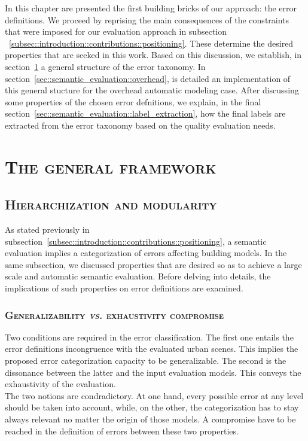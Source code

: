 \minitoc

\vfill

In this chapter are presented the first building bricks of our approach: the error definitions.
We proceed by reprising the main consequences of the constraints that were imposed for our evaluation approach in subsection ~\ref{subsec::introduction::contributions::positioning}.
These determine the desired properties that are seeked in this work.
Based on this discussion, we establish, in section~\ref{sec::semantic_evaluation::general_framework} a general structure of the error taxonomy.
In section~\ref{sec::semantic_evaluation::overhead}, is detailed an implementation of this general stucture for the overhead automatic modeling case.
After discussing some properties of the chosen error defnitions, we explain, in the final section~\ref{sec::semantic_evaluation::label_extraction}, how the final labels are extracted from the error taxonomy based on the quality evaluation needs.

\clearpage

\section{\textsc{The general framework}}
    \label{sec::semantic_evaluation::general_framework}

    \subsection{\textsc{Hierarchization and modularity}}
        \label{subsec::semantic_evaluation::general_framework::hierarchization_moderularity}
        As stated previously in subsection~\ref{subsec::introduction::contributions::positioning}, a semantic evaluation implies a categorization of errors affecting building models.
        In the same subsection, we discussed properties that are desired so as to achieve a large scale and automatic semantic evaluation.
        Before delving into details, the implications of such properties on error definitions are examined.

        \subsubsection{\textsc{Generalizability \textit{vs.} exhaustivity compromise}}
            Two conditions are required in the error classification.
            The first one entails the error definitions incongruence with the evaluated urban scenes.
            This implies the proposed error categorization capacity to be generalizable.
            The second is the dissonance between the latter and the input evaluation models.
            This conveys the exhaustivity of the evaluation.\\
            The two notions are condradictory.
            At one hand, every possible error at any level should be taken into account, while, on the other, the categorization has to stay always relevant no matter the origin of those models.
            A compromise have to be reached in the definition of errors between these two properties.
        
